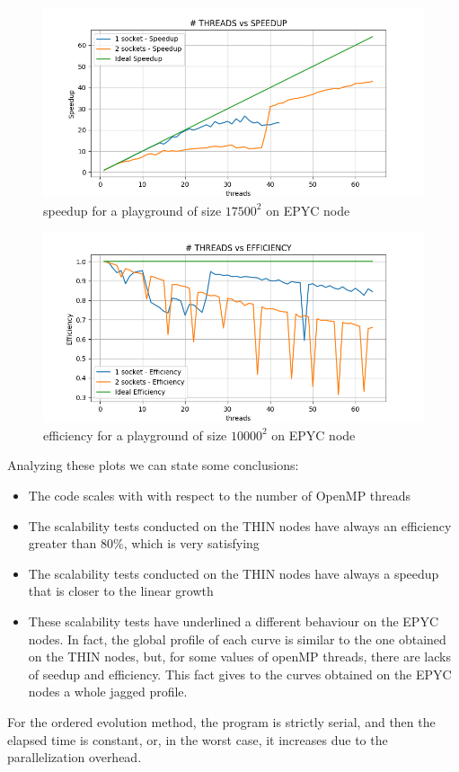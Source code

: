 \documentclass[12pt, titlepage]{report}
\begin{document}
\begin{figure}[H]
	\centering
	\includegraphics[width=\textwidth]{Assignment-1/OMP-static-17500-10-EPYC-1socketspeedUp.png}
	\caption{speedup for a playground of size $17500^2$ on EPYC node}
\end{figure}
\begin{figure}[H]
	\centering
	\includegraphics[width=\textwidth]{Assignment-1/OMP-static-10000-10-EPYC-1socketefficiency.png}
	\caption{efficiency for a playground of size $10000^2$ on EPYC node}
\end{figure}
Analyzing these plots we can state some conclusions:
\begin{itemize}
	\item The code scales with with respect to the number of OpenMP threads
	\item The scalability tests conducted on the THIN nodes have always an eﬀiciency greater than $80\%$, which is very satisfying
	\item The scalability tests conducted on the THIN nodes have always a speedup that is closer to the linear growth
	\item These scalability tests have underlined a different behaviour on the EPYC nodes. In fact, the global profile of each curve is similar to the 
	one obtained on the THIN nodes, but, for some values of openMP threads, there are lacks of seedup and efficiency. This fact gives to the curves obtained
	on the EPYC nodes a whole jagged profile. 
\end{itemize}
For the ordered evolution method, the program is strictly serial, and then the elapsed time is constant, or, in the worst case, it increases due 
to the parallelization overhead. 
\end{document}
